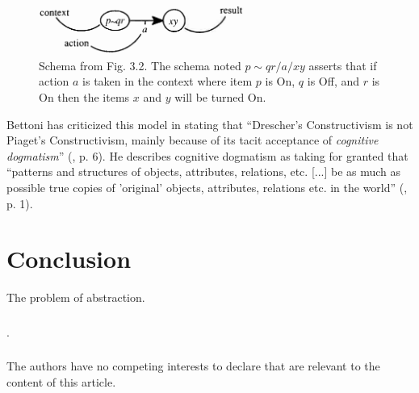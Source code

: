 \documentclass[runningheads]{llncs}
\begin{document}
\begin{figure}
	\centering
	\includegraphics[width=0.6\textwidth]{Figure_2_schema_drescher.png}
	\caption{Schema from \cite{drescher_made-up_1991} Fig. 3.2.
	The schema noted $p \!\sim\! qr/a/xy$ asserts that if action $a$ is taken in the context where item $p$ is On, $q$ is Off, and $r$ is On then the items $x$ and $y$ will be turned On.} 
	\label{fig:drescher}
\end{figure}

Bettoni  has criticized this model in stating that ``Drescher's Constructivism is not Piaget's Constructivism, mainly because of its tacit acceptance of \textit{cognitive dogmatism}'' (\cite{bettoni_made-up_1993}, p. 6).
He describes cognitive dogmatism as taking for granted that ``patterns and structures of objects, attributes, relations, etc. [...] be as much as possible true copies of 'original' objects, attributes, relations etc. in the world'' (\cite{bettoni_made-up_1993}, p. 1).
 
\cite{drescher_made-up_1991}
\cite{chaput_constructivist_2004}
\cite{georgeon_intrinsically-motivated_2012} 
\cite{perotto_computational_nodate} 
\cite{guerin_piagetian_2008}
\cite{wang_new_2012}
\section{Conclusion}

The problem of abstraction. 


\begin{credits}
\subsubsection{\ackname} .

\subsubsection{\discintname}
The authors have no competing interests to declare that are
relevant to the content of this article.
\end{credits}
%
%
%


%
\end{document}
